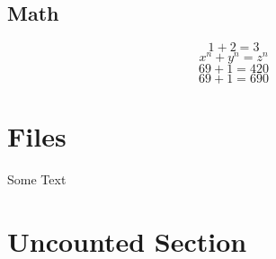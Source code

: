 \subsection{Math}
\label{math}
$$1+2 = 3$$
\[x^n + y^n = z^n\]
\begin{displaymath}
69 + 1 = 420
\end{displaymath}
\begin{equation}
69 + 1 = 690
\end{equation}
\section{Files}
Some Text



\section*{Uncounted Section}

